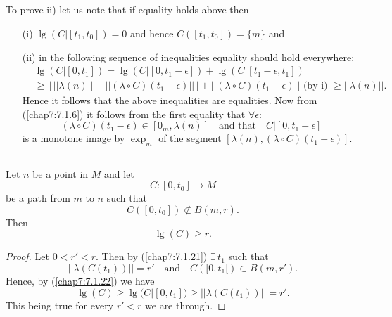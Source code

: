 \subsection{}\label{chap7:7.1.26}
To prove ii) let us note that if equality holds above then
\begin{itemize}
\item[(i)] $\lg(C|[t_{1},t_{0}])=0$ and hence $C([t_{1},t_{0}])=\{m\}$
  and

\item[(ii)] in the following sequence of inequalities equality should
  hold everywhere:
\begin{align*}
& \lg(C|[0,t_{1}])=\lg(C|[0, t_{1}-\epsilon])+\lg(C|[t_{1}-\epsilon,
  t_{1}])\\
& \geq \,\big|\,||\lambda(n)||-||(\lambda\circ
  C)(t_{1}-\epsilon)||\,\big|+||(\lambda\circ
  C)(t_{1}-\epsilon)||\text{ (by i) }\geq ||\lambda(n)||.
\end{align*}
Hence \pageoriginale it follows that the above inequalities are
equalities. Now from (\ref{chap7:7.1.6}) it follows from the first
equality that $\forall \epsilon$:
$$
(\lambda\circ C)(t_{1}-\epsilon)\in [0_{m},\lambda(n)]\quad\text{and
  that}\quad C|[0,t_{1}-\epsilon]
$$
is a monotone image by $\exp_{m}$ of the segment
$[\lambda(n),(\lambda\circ C)(t_{1}-\epsilon)]$.
\end{itemize}

\setcounter{subsection}{27}

\subsection{}\label{chap7:7.1.28}

\begin{lemma*}
Let $n$ be a point in $M$ and let
$$
C:[0,t_{0}]\to M
$$
be a path from $m$ to $n$ such that
$$
C([0,t_{0}])\not\subset B(m,r).
$$
Then
$$
\lg(C)\geq r.
$$
\end{lemma*}

\begin{proof}
Let $0<r'<r$. Then by (\ref{chap7:7.1.21}) $\exists\, t_{1}$ such that
$$
||\lambda(C(t_{1}))||=r'\quad\text{and}\quad C([0,t_{1}[)\subset B(m,r').
$$
Hence, by (\ref{chap7:7.1.22}) we have
$$
\lg(C)\geq \lg(C|[0,t_{1}])\geq ||\lambda(C(t_{1}))||=r'.
$$
This being true for every $r'<r$ we are through.
\end{proof}

\subsection{}\label{chap7:7.1.29}

